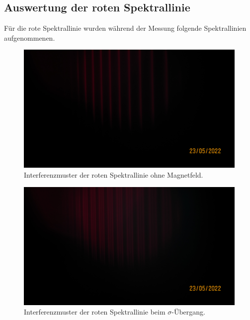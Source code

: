 \subsection{Auswertung der roten Spektrallinie}
\label{sec:rot}
Für die rote Spektrallinie wurden während der Messung folgende Spektrallinien aufgenommenen.

\begin{figure}[H]
    \centering
    \includegraphics[scale= 0.2]{Messung/Rot[6].JPG}
    \caption{Interferenzmuster der roten Spektrallinie ohne Magnetfeld.}
    \label{fig:rot}
\end{figure}
\noindent

\begin{figure}[H]
    \centering
    \includegraphics[scale= 0.2]{Messung/Rot_Sigma[7].JPG}
    \caption{Interferenzmuster der roten Spektrallinie beim $\sigma$-Übergang.}
    \label{fig:rot_sigma}
\end{figure}
\noindent

